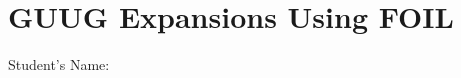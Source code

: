 \documentclass[12pt, a4paper, addpoints]{exam}
\newcommand{\gap}{\vspace{22mm}}
\newcommand{\Gap}{\vspace{44mm}}
\newcommand{\guug}{%
    \pgfmathtruncatemacro{\a}{random(2,9)} %
    \pgfmathtruncatemacro{\b}{random(2,9)} %
    \edef\result{(\b x +1 )(x + \a)}%
    \result
}
\begin{document}
\section*{ GUUG Expansions Using FOIL}
\quad Student's Name: \underline{\hspace{5cm}}

\begin{questions}
\LARGE

\question
\gap
\setlength{\columnsep}{20pt}
\begin{multicols}{3}

\begin{parts}
    \part \( \guug \)
   \Gap
       \part \( \guug \)
   \Gap
       \part \( \guug \)
   \Gap
       \part \( \guug \)
   \Gap
       \part \( \guug \)
   \Gap
       \part \( \guug \)
   \Gap
       \part \( \guug \)
   \Gap
       \part \( \guug \)
   \Gap
       \part \( \guug \)
   \Gap
           \part \( \guug \)
   \Gap
           \part \( \guug \)
   \Gap
       \part \( \guug \)
   \Gap

\end{parts}
\end{multicols}


\end{questions}
\end{document}
